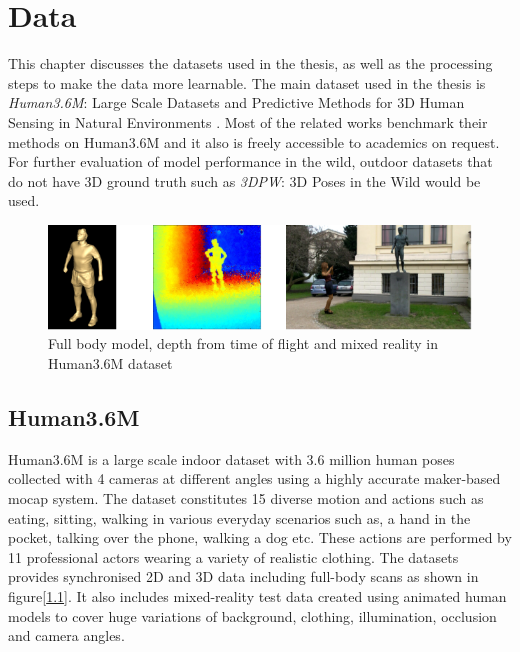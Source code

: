 \chapter{Data}
\label{chap:data}
This chapter discusses the datasets used in the thesis, as well as the processing steps to make the data more learnable. The main dataset used in the thesis is \textit{Human3.6M}: Large Scale Datasets and Predictive Methods for 3D Human Sensing in Natural Environments \cite{H3.6}. Most of the related works benchmark their methods on Human3.6M and it also is freely accessible to academics on request. For further evaluation of model performance in the wild, outdoor datasets that do not have 3D ground truth such as \textit{3DPW}: 3D Poses in the Wild \cite{3dpw} would be used.

\begin{figure}[h]
    \centering
    \includegraphics[width=\textwidth]{figures/h36/modlities.png}
    \caption{Full body model, depth from time of flight and mixed reality in Human3.6M dataset}
    \label{fig:h36_modality}
\end{figure}

\section{Human3.6M}
Human3.6M is a large scale indoor dataset with 3.6 million human poses collected with 4 cameras at different angles using a highly accurate maker-based \ac{mocap} system. The dataset constitutes 15 diverse motion and actions such as eating, sitting, walking in various everyday scenarios such as, a hand in the pocket, talking over the phone, walking a dog etc. These actions are performed by 11 professional actors wearing a variety of realistic clothing. The datasets provides synchronised 2D and 3D data including full-body scans as shown in figure[\ref{fig:h36_modality}]. It also includes mixed-reality test data created using animated human models to cover huge variations of background, clothing, illumination, occlusion and camera angles.


